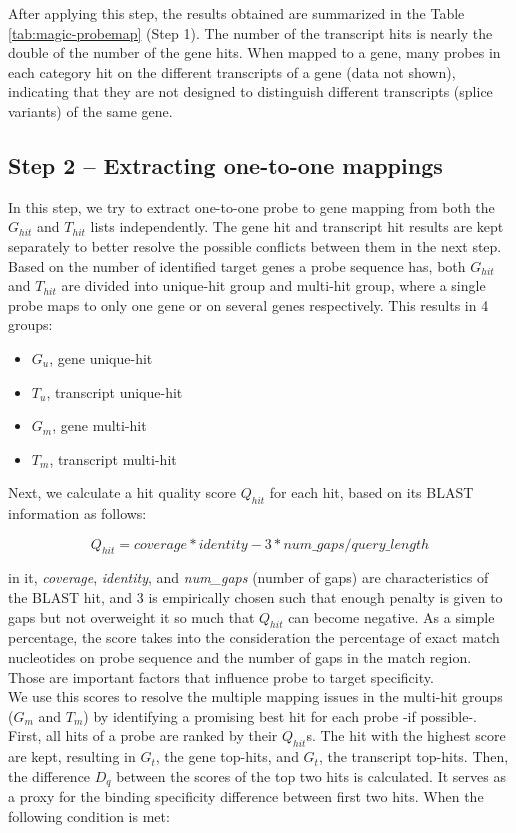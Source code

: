After applying this step, the results obtained are summarized in the Table 
\ref{tab:magic-probemap} (Step 1). 
The number of the transcript hits is nearly the double of the number of the 
gene hits.
When mapped to a gene, many probes in each category hit on the different 
transcripts of a gene (data not shown),
indicating that they are not designed to distinguish different 
transcripts (splice variants) of the same gene.

\subsection{Step 2 – Extracting one-to-one mappings}

In this step, we try to extract one-to-one probe to gene mapping from both the 
$G_{hit}$ and $T_{hit}$ lists independently. 
The gene hit and transcript hit results are kept separately to better resolve 
the possible conflicts between them in the next step. 
Based on the number of identified target genes a probe sequence has, both 
$G_{hit}$ and $T_{hit}$ are divided into unique-hit group and 
multi-hit group, where a single probe maps to only one gene or on several genes 
respectively. This results in 4 groups: 

\begin{itemize}
\item $G_u$, gene unique-hit
\item $T_u$, transcript unique-hit
\item $G_m$, gene multi-hit
\item $T_m$, transcript multi-hit
\end{itemize}

Next, we calculate a hit quality score $Q_{hit}$ for each hit, based on its 
BLAST information as follows:  

\begin{equation}
Q_{hit} = coverage * identity - 3 * num\_gaps / query\_length
\end{equation}

in it, \textit{coverage},  \textit{identity}, and \textit{num\_gaps} (number 
of gaps) are characteristics of the BLAST hit, 
and $3$ is empirically chosen such that enough penalty is given to gaps but not 
overweight it so much that $Q_{hit}$ can become negative. As a simple 
percentage, the score takes into the consideration the percentage of exact 
match nucleotides on probe sequence and the number of gaps in the match region. 
Those are important factors that influence probe to target specificity.  \\
We use this scores to resolve the multiple mapping issues in the multi-hit 
groups ($G_m$ and $T_m$) by identifying a promising best hit for each probe -if 
possible-.
First, all hits of a probe are ranked by their $Q_{hit}$s. The hit with the 
highest score are kept, resulting in $G_t$, the gene top-hits, and $G_t$, the 
transcript top-hits.
Then, the difference $D_q$ between the scores of the top two hits is 
calculated. 
It serves as a proxy for the binding specificity difference between first two 
hits. When the following condition is met: 


